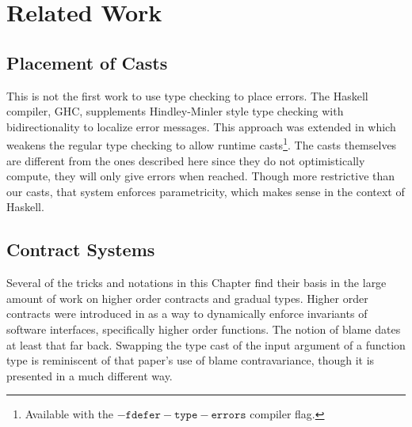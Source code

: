 \section{Related Work}
 
 
 
 
\subsection{\Bidir{} Placement of Casts}
 
This is not the first work to use \bidir{} type checking to place errors.
The Haskell compiler, GHC, supplements Hindley-Minler style type checking with bidirectionality to localize error messages.
This approach was extended in \cite{10.1145/2364527.2364554} which weakens the regular type checking to allow runtime casts\footnote{
 Available with the $\mathtt{-fdefer-type-errors}$ compiler flag.}.
The casts themselves are different from the ones described here since they do not optimistically compute, they will only give errors when reached.
Though more restrictive than our casts, that system enforces parametricity, which makes sense in the context of Haskell. 

 

\subsection{Contract Systems}
 
Several of the tricks and notations in this Chapter find their basis in the large amount of work on higher order contracts and gradual types.
Higher order contracts were introduced in \cite{10.1145/581478.581484} as a way to dynamically enforce invariants of software interfaces, specifically higher order functions.
The notion of blame dates at least that far back.
Swapping the type cast of the input argument of a function type is reminiscent of that paper's use of blame contravariance, though it is presented in a much different way.
 
